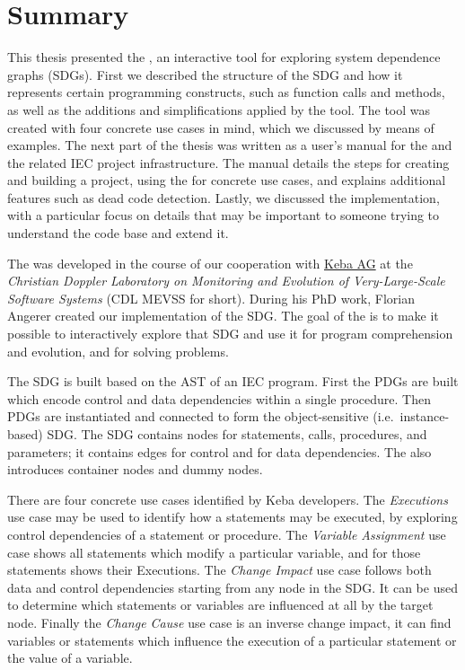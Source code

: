 \chapter{Summary} \label{ch:summary}

This thesis presented the \SB, an interactive tool for exploring system dependence graphs (SDGs). First we described 
the structure of the SDG and how it represents certain programming constructs, such as function calls and methods, as 
well as the additions and simplifications applied by the tool. The tool was created with four concrete use cases in 
mind, which we discussed by means of examples. The next part of the thesis was written as a user's manual for the \SB 
and the related IEC project infrastructure. The manual details the steps for creating and building a project, using the 
\SB for concrete use cases, and explains additional features such as dead code detection. Lastly, we discussed the 
implementation, with a particular focus on details that may be important to someone trying to understand the \SB code 
base and extend it.

The \SB was developed in the course of our cooperation with \href{http://www.keba.com}{Keba AG} at the \emph{Christian 
Doppler Laboratory on Monitoring and Evolution of Very-Large-Scale Software Systems} (CDL MEVSS for short). During his 
PhD work, Florian Angerer created our implementation of the SDG. The goal of the \SB is to make it possible to 
interactively explore that SDG and use it for program comprehension and evolution, and for solving problems.

The SDG is built based on the AST of an IEC program. First the PDGs are built which encode control and data 
dependencies within a single procedure. Then PDGs are instantiated and connected to form the object-sensitive (i.e.\ 
instance-based) SDG. The SDG contains nodes for statements, calls, procedures, and parameters; it contains edges for 
control and for data dependencies. The \SB also introduces container nodes and dummy nodes.
  
There are four concrete use cases identified by Keba developers. The \emph{Executions} use case may be used to identify 
how a statements may be executed, by exploring control dependencies of a statement or procedure. The \emph{Variable   
Assignment} use case shows all statements which modify a particular variable, and for those statements shows their 
Executions. The \emph{Change Impact} use case follows both data and control dependencies starting from any node in the 
SDG. It can be used to determine which statements or variables are influenced at all by the target node. Finally the 
\emph{Change Cause} use case is an inverse change impact, it can find variables or statements which influence the 
execution of a particular statement or the value of a variable.

